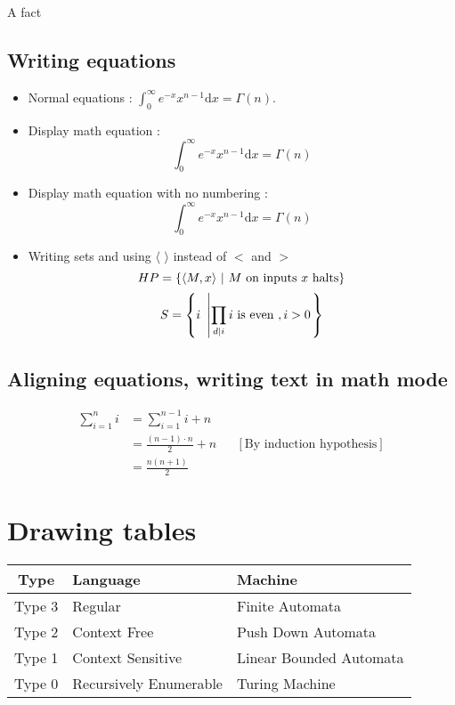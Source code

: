 \begin{fact}
	A fact
\end{fact}


\subsection{Writing equations}
\begin{itemize}
\item Normal equations : 
	$\int_0^\infty e^{-x} x^{n-1} \mathrm{d}x = \Gamma(n)$.
\item Display math equation : 
	\begin{equation}
	\int_0^\infty e^{-x} x^{n-1} \mathrm{d}x = \Gamma(n)
	\end{equation}
\item Display math equation with no numbering : 
	\begin{equation*}
	\int_0^\infty e^{-x} x^{n-1} \mathrm{d}x = \Gamma(n)
	\end{equation*}
\item Writing sets and using $\langle$ $\rangle$ instead of $<$ and $>$
	\begin{equation}
	HP = {\left\{  \langle M,x \rangle ~|~ \text{$M$ on inputs $x$ halts}  \right\}}
	\end{equation}
	\begin{equation}
	S =  {\left\{  i ~\left |  \prod_{d | i} i \text{ is even }, i > 0 \right .  \right\}}
	\end{equation}
\end{itemize}

\subsection{Aligning equations, writing text in math mode}
\begin{align*}
\sum_{i=1}^n i & = \sum_{i=1}^{n-1} i + n \\
			   & = \frac{(n-1)\cdot n}{2} + n && [\text{By induction hypothesis}]\\
			   & = \frac{n(n+1)}{2}
\end{align*}




\section{Drawing tables}
\begin{center}
\begin{tabular}{||c|l|l||}
\hline 
\textbf{Type} & \textbf{Language} & \textbf{Machine} \\ 
\hline \hline
Type 3 & Regular & Finite Automata \\ 
\hline 
Type 2 & Context Free & Push Down Automata \\ 
\hline 
Type 1 & Context Sensitive & Linear Bounded Automata \\ 
\hline
Type 0 & Recursively Enumerable & Turing Machine \\ 
\hline 
\end{tabular} 
\end{center}

